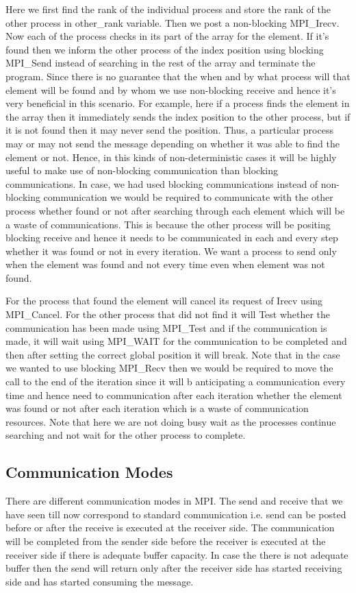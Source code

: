 \documentclass[12pt]{article}
\begin{document}
Here we first find the rank of the individual process and store the rank of the other process in other\_rank variable. Then we post a non-blocking MPI\_Irecv. Now each of the process checks in its part of the array for the element. If it's found then we inform the other process of the index position using blocking MPI\_Send instead of searching in the rest of the array and terminate the program. Since there is no guarantee that the when and by what process will that element will be found and by whom we use non-blocking receive and hence it's very beneficial in this scenario. For example, here if a process finds the element in the array then it immediately sends the index position to the other process, but if it is not found then it may never send the position. Thus, a particular process may or may not send the message depending on whether it was able to find the element or not. Hence, in this kinds of non-deterministic cases it will be highly useful to make use of non-blocking communication than blocking communications. In case, we had used blocking communications instead of non-blocking communication we would be required to communicate with the other process whether found or not after searching through each element which will be a waste of communications. This is because the other process will be positing blocking receive and hence it needs to be communicated in each and every step whether it was found or not in every iteration. We want a process to send only when the element was found and not every time even when element was not found.

For the process that found the element will cancel its request of Irecv using MPI\_Cancel. For the other process that did not find it will Test whether the communication has been made using MPI\_Test and if the communication is made, it will wait using MPI\_WAIT for the communication to be completed and then after setting the correct global position it will break. Note that in the case we wanted to use blocking MPI\_Recv then we would be required to move the call to the end of the iteration since it will b anticipating a communication every time and hence need to communication after each iteration whether the element was found or not after each iteration which is a waste of communication resources. Note that here we are not doing busy wait as the processes continue searching and not wait for the other process to complete.

\subsection{Communication Modes}
There are different communication modes in MPI. The send and receive that we have seen till now correspond to standard communication i.e. send can be posted before or after the receive is executed at the receiver side. The communication will be completed from the sender side before the receiver is executed at the receiver side if there is adequate buffer capacity. In case the there is not adequate buffer then the send will return only after the receiver side has started receiving side and has started consuming the message. 
\end{document}
